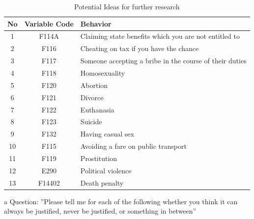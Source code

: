 \documentclass{article}[hidelinks]
\begin{document}
\begin{table}[htb]
  \centering
    \begin{threeparttable}
      \caption{Potential Ideas for further research}
       \centering  %
        \begin{tabular}{c c l  }
          \toprule
          {No} & {Variable Code}& {Behavior} \\\toprule[1pt]
            1 & F114A & Claiming state benefits which you are not entitled to \\ 
              2 & F116 & Cheating on tax if you have the chance \\ 
              3 & F117 & Someone accepting a bribe in the course of their duties \\ 
              4 & F118 & Homosexuality \\ 
              5 & F120 & Abortion \\ 
              6 & F121 & Divorce \\ 
              7 & F122 & Euthanasia \\ 
              8 & F123 & Suicide \\ 
              9 & F132 & Having casual sex \\ 
              10 & F115 & Avoiding a fare on public transport\\ 
              11 & F119 & Prostitution \\ 
              12 & E290 & Political violence \\ 
              13 & F14402 & Death penalty \\ 
          \bottomrule
        \end{tabular}
            \label{tab:variables}

        \begin{tablenotes}
          \item[a] Question: ''Please tell me for each of the following whether you think it can always be justified, never be justified, or something in between'' 
        \end{tablenotes}
    \end{threeparttable}
  \end{table}
\end{document}
